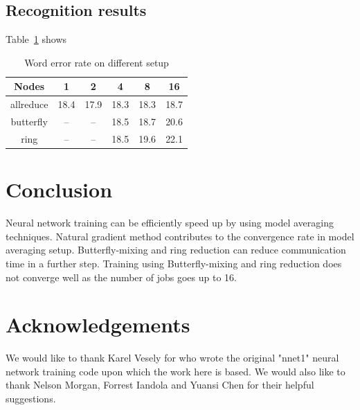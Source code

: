 \documentclass{article}
\begin{document}
\subsection{Recognition results}
Table~\ref{tab:wer} shows
\begin{table}
  \centering
  \begin{tabular}{c|c|c|c|c|c}
    \hline
    Nodes       & 1    & 2     & 4    & 8    & 16 \\
    \hline
    allreduce   & 18.4 & 17.9  & 18.3 & 18.3 & 18.7 \\
    butterfly   & --   & --    & 18.5 & 18.7 & 20.6 \\
    ring        & --   & --    & 18.5 & 19.6 & 22.1\\
    \hline
  \end{tabular}
  \caption{Word error rate on different setup}
  \label{tab:wer}
\end{table}

\section{Conclusion}
Neural network training can be efficiently speed up by using model averaging techniques.
Natural gradient method contributes to the convergence rate in model averaging setup.
Butterfly-mixing and ring reduction can reduce communication time in a further step.
Training using Butterfly-mixing and ring reduction does not converge well as the number of jobs goes up to 16.

\section{Acknowledgements}
We would like to thank Karel Vesely for who wrote the original "nnet1" neural network training code
upon which the work here is based. We would also like to thank Nelson Morgan, Forrest Iandola and Yuansi Chen
for their helpful suggestions.



\end{document}
